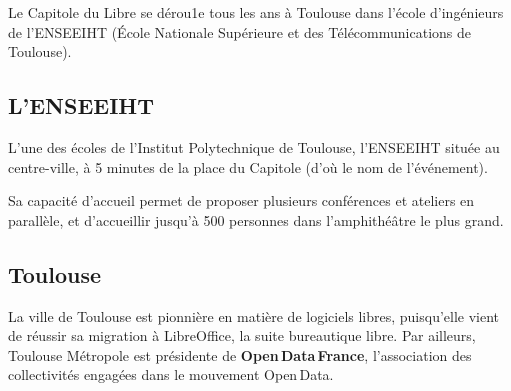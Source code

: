 
Le Capitole du Libre se dérou1e tous les ans à Toulouse dans l'école
 d'ingénieurs de l'ENSEEIHT (École Nationale Supérieure
 et des Télécommunications de Toulouse). 

\subsection{L'ENSEEIHT}

L'une des écoles de l'Institut Polytechnique de Toulouse, l'ENSEEIHT
 située au centre-ville, à 5 minutes de la place du Capitole
 (d'où le nom de l'événement).

Sa capacité d'accueil permet de proposer plusieurs conférences et
 ateliers en parallèle, et d'accueillir jusqu'à 500 personnes dans
 l'amphithéâtre le plus grand.

\subsection{Toulouse}

La ville de Toulouse est pionnière en matière de logiciels libres,
 puisqu'elle vient de réussir sa migration à LibreOffice, la suite
 bureautique libre. Par ailleurs, Toulouse Métropole est présidente de
 \textbf{Open\,Data\,France}, l'association des collectivités
 engagées dans le mouvement Open\,Data.

